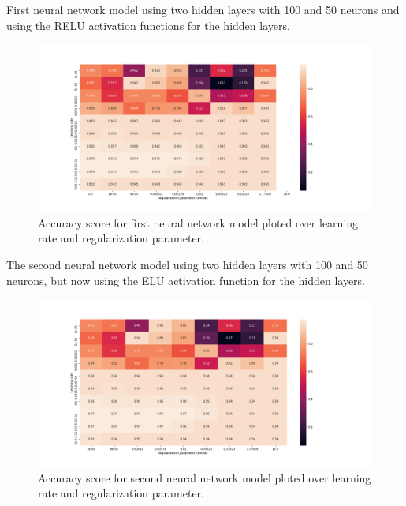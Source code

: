 \documentclass[reprint,english,notitlepage]{revtex4-2}  %
\begin{document}
First neural network model using two hidden layers with 100 and 50 neurons and using the RELU activation functions for the hidden layers.
\begin{figure}[!htb]
	\centering\includegraphics[trim=140 20 100 0, scale=0.3]{NNClass2}
	\caption{Accuracy score for first neural network model ploted over learning rate and regularization parameter.  }\label{figure}
\end{figure}
\newline

The second neural network model using two hidden layers with 100 and 50 neurons, but now using the ELU activation function for the hidden layers. 
\begin{figure}[!htb]
	\centering\includegraphics[trim=140 20 100 0, scale=0.3]{NNClass3}
	\caption{Accuracy score for second neural network model ploted over learning rate and regularization parameter.  }\label{figure}
\end{figure}
\end{document}
